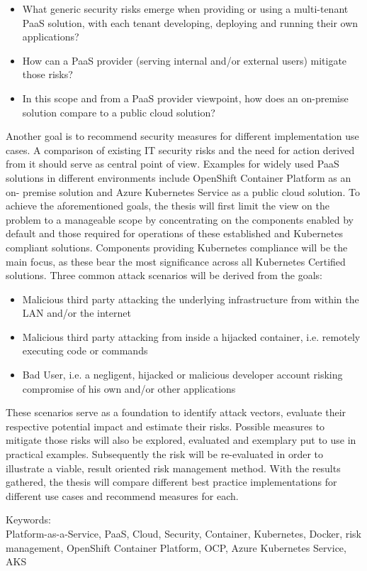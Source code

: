 \begin{itemize}

\item What generic security risks emerge when providing or using a multi-tenant PaaS solution,
with each tenant developing, deploying and running their own applications? 

\item How can a PaaS provider (serving internal and/or external users) mitigate those risks? 

\item  In this scope and from a PaaS provider viewpoint, how does an on-premise solution compare
to a public cloud solution? 

\end{itemize}

Another goal is to recommend security measures for different implementation use cases.
A comparison of existing IT security risks and the need for action derived from it should serve as central point of view.
Examples for widely used PaaS solutions in different environments include OpenShift Container Platform 
as an on- premise solution and Azure Kubernetes Service as a public cloud solution.
To achieve the aforementioned goals, the thesis will first limit the view on the problem to a manageable scope by
concentrating on the components enabled by default and those required for operations of these established and Kubernetes compliant solutions.
Components providing Kubernetes compliance will be the main focus, as these bear the most significance across all Kubernetes Certified solutions. 
Three common attack scenarios will be derived from the goals:

\begin{itemize}

\item Malicious third party attacking the underlying infrastructure from within the LAN and/or the
internet

\item Malicious third party attacking from inside a hijacked container, i.e. remotely executing code
or commands

\item Bad User, i.e. a negligent, hijacked or malicious developer account risking compromise of
his own and/or other applications

\end{itemize}

These scenarios serve as a foundation to identify attack vectors, evaluate their respective potential impact and estimate their risks.
Possible measures to mitigate those risks will also be explored, evaluated and exemplary put to use in practical examples.
Subsequently the risk will be re-evaluated in order to illustrate a viable, result oriented risk management method.
With the results gathered, the thesis will compare different best practice implementations for different use cases and recommend measures for each.


\bigskip

\noindent
Keywords: \\
Platform-as-a-Service, PaaS, Cloud, Security, Container, Kubernetes, Docker, risk management, OpenShift Container Platform, OCP, Azure Kubernetes Service, AKS

